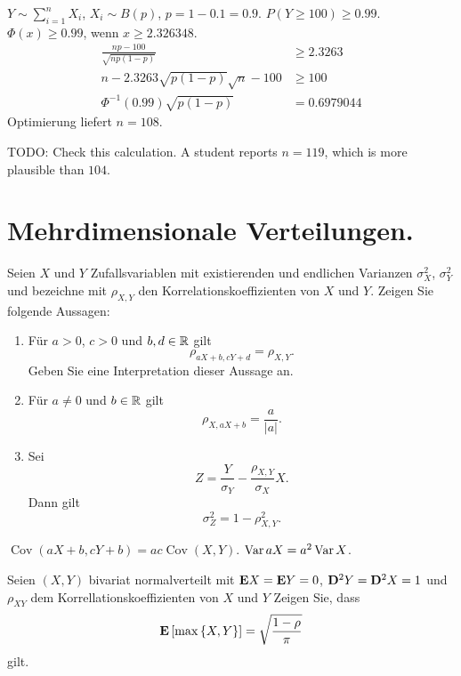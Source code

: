 \solution $Y\sim \sum_{i=1}^{n} X_i$, $X_i \sim B(p)$,
$p=1-0.1=0.9$.  $P(Y\geq 100) \geq 0.99$. $\Phi(x) \geq 0.99$, wenn $x\geq
2.326348$. 
\begin{align*}
    \frac{np - 100}{ \sqrt{np(1-p)} } &\geq 2.3263 \\
    n - 2.3263 \sqrt{p(1-p)} \sqrt{n} -100 &\geq 100 \\
    \Phi^{-1}(0.99) \sqrt{p(1-p)} &= 0.6979044
\end{align*}
Optimierung liefert $n=108$.

TODO: Check this calculation. A student reports $n=119$, which is more
plausible than $104$. 


\section{Mehrdimensionale Verteilungen.}

 Seien $X$ und $Y$
Zufallsvariablen mit existierenden und endlichen Varianzen $\sigma^2_{X}$, $\sigma^2_{Y}$ und bezeichne mit
$\rho_{X,Y}$ den Korrelationskoeffizienten von $X$ und $Y$. Zeigen Sie folgende
Aussagen: 
\begin{enumerate}
    \item Für $a>0$, $c>0$ und $b,d\in\mathbb R$ gilt
        \begin{equation*}
            \rho_{aX + b, cY + d} = \rho_{X,Y}.
        \end{equation*}
        Geben Sie eine Interpretation dieser Aussage an. 
    \item Für $a\neq 0$ und $b\in\mathbb R$ gilt
        \begin{equation*}
            \rho_{X, aX+b} = \frac{a}{|a|}.
        \end{equation*}

    \item Sei
        \begin{equation*}
            Z = \frac{Y}{\sigma_{Y}} - \frac{\rho_{X,Y}}{\sigma_{X}} X.
        \end{equation*}
        Dann gilt
        \begin{equation*}
            \sigma^2_{Z} = 1 - \rho^{2}_{X,Y}.
        \end{equation*}
\end{enumerate}

\solution$\operatorname{Cov}(aX+b, cY + b)= ac
\operatorname{Cov}(X,Y)$. $\operatorname{Var} aX = a^2 \operatorname{Var} X$. 

 Seien $(X,Y)$ bivariat normalverteilt
mit $\mathbf E X=\mathbf E Y=0$, $\mathbf D^{2}Y=\mathbf D^{2}X=1$ und $\rho_{XY}$ dem Korrellationskoeffizienten
von $X$ und $Y$
Zeigen Sie, dass
\begin{equation*}
    \mathbf E \left[ \max\left\{ X,Y \right\} \right] = \sqrt{\frac{1-\rho}{\pi}}
\end{equation*}
gilt.

